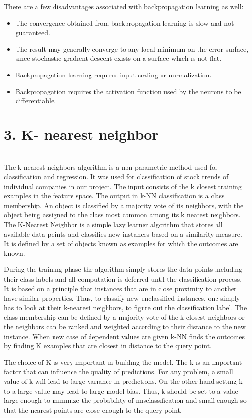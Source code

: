 There are a few disadvantages associated with backpropagation learning as well: 
\begin{itemize}
 	\item The convergence obtained from backpropagation learning is slow and not guaranteed. 
	\item The result may generally converge to any local minimum on the error surface, since stochastic gradient descent exists on a surface which is not flat. 
	\item Backpropagation learning requires input scaling or normalization. 
	\item Backpropagation requires the activation function used by the neurons to be differentiable.
\end{itemize}

\chapter{\textbf{3. K- nearest neighbor}}\\
The k-nearest neighbors algorithm is a non-parametric method used for classification and regression. \cite{Knn} It was used for classification of stock trends of individual companies in our project. The input consists of the k closest training examples in the feature space. The output in k-NN classification is a class membership. An object is classified by a majority vote of its neighbors, with the object being assigned to the class most common among its k nearest neighbors. The K-Nearest Neighbor  is a simple lazy learner algorithm that stores all available data points  and classifies new instances based on a similarity measure. It is defined by a set of objects known as examples for which the outcomes are known.

During the training phase the algorithm simply stores the data points including their class labels and all computation is deferred until the classification process. It is based on a principle that instances that are in close proximity to another have similar properties. Thus, to classify new unclassified instances, one simply has to look at their k-nearest neighbors, to figure out  the classification label. The class membership can be defined by a majority vote of the k closest neighbors or the neighbors can be ranked and weighted according to their distance to the new instance. When new case of dependent values are given k-NN finds the outcomes by finding K examples that are closest in distance to the query point.

The choice of K is very important in building the model. \cite{cho} The k is an important factor that can influence the quality of predictions. For any problem, a small value of k will lead to large variance in predictions. On the other hand setting k to a large value may lead to large model bias. Thus, k should be set to a value large enough to minimize the probability of misclassification and small enough so that the nearest points are close enough to the query point.

